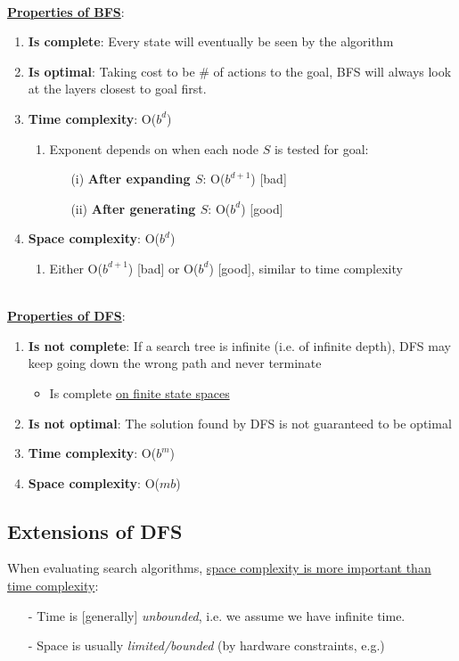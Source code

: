 \documentclass[12pt]{extarticle}
\theoremstyle{definition}
\theoremstyle{remark}
\newcommand{\pstart}[0]{\noindent}
\newcommand{\newp}[0]{~\\ \pstart}
\newcommand{\titleul}[1]{\noindent \textbf{\ul{#1}}}
\begin{document}
\newp
\titleul{Properties of BFS}: \begin{enumerate}
    \item \textbf{Is complete}: Every state will eventually be seen by the algorithm
    \item \textbf{Is optimal}: Taking cost to be \# of actions to the goal, BFS will always look at the layers closest to goal first.
    \item \textbf{Time complexity}: O($b^d$) \begin{enumerate}
        \item Exponent depends on when each node $S$ is tested for goal: \begin{itemize}
            \item[(i)] \textbf{After expanding $S$}: O($b^{d+1}$) [bad]
            \item[(ii)] \textbf{After generating $S$}: O($b^d$) [good]
        \end{itemize} 
    \end{enumerate}
    \item \textbf{Space complexity}: O($b^d$) \begin{enumerate}
        \item Either O($b^{d+1}$) [bad] or O($b^d$) [good], similar to time complexity
    \end{enumerate}
\end{enumerate}

\newp
\titleul{Properties of DFS}: \begin{enumerate}
    \item \textbf{Is not complete}: If a search tree is infinite (i.e. of infinite depth), DFS may keep going down the wrong path and never terminate \begin{itemize}
        \item Is complete \ul{on finite state spaces}
    \end{itemize}
    \item \textbf{Is not optimal}: The solution found by DFS is not guaranteed to be optimal
    \item \textbf{Time complexity}: O($b^m$)
    \item \textbf{Space complexity}: O($mb$)
\end{enumerate}

\subsection{Extensions of DFS}
When evaluating search algorithms, \ul{space complexity is more important than time complexity}: \begin{itemize}
    \item[-] Time is [generally] \textit{unbounded}, i.e. we assume we have infinite time.
    \item[-] Space is usually \textit{limited/bounded} (by hardware constraints, e.g.)
\end{itemize}
\end{document}
